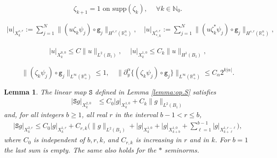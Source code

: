 \documentclass[10pt,a4paper]{amsart}
\newtheorem{lemma}{Lemma}
\newcommand{\N}{{\mathbb N}}
\newcommand{\R}{{\mathbb R}}
\renewcommand{\a}{\alpha}
\newcommand{\pa}{\partial}
\begin{document}
\begin{equation} \label{zeta.k.is.1.where}
\zeta_{k+1} = 1 \text{ on } \mathrm{supp}(\zeta_k), 
\quad \ \forall k \in \N_0.
\end{equation}

\begin{align} \label{def.seminorm}
|u|_{X^{s,r}_k} := \sum_{j=1}^N \| (u \zeta_k \psi_j) \circ \mathtt g_j \|_{H^{s,r}(\R^n_+)},
\quad 
|u|_{X^{s,r}_{*,k}} := \sum_{j=1}^N \| (u \zeta^*_k \psi_j) \circ \mathtt g_j \|_{H^{s,r}(\R^n_+)},
\end{align}

\begin{align} \label{est.u.X.low}
|u|_{X^{0,0}_k} \leq C \| u \|_{L^2(B_1)}, \quad \ 
|u|_{X^{1,0}_k} \leq C_k \| u \|_{H^1(B_1)}, 
\end{align}

\begin{equation}  \label{est.zeta.k.psi.j}
\| (\zeta_k \psi_j) \circ \mathtt g_j \|_{L^\infty(\R^n_+)} \leq 1, \quad 
\| \pa_y^\a \{ (\zeta_k \psi_j) \circ \mathtt g_j \} \|_{L^\infty(\R^n_+)} \leq C_\a 2^{k|\a|}. 
\end{equation}

\begin{lemma} \label{lemma:pinoli.S}
The linear map $\mathtt S$ defined in Lemma \ref{lemma:op.S} satisfies 
\begin{align}
|\mathtt S g|_{X^{2,0}_k} 
& \leq C_0 |g|_{X^{1,0}_k} + C_k \| g \|_{L^2(B_1)} 
\label{pinoli.15}
\end{align}
and, for all integers $b \geq 1$, all real $r$ in the interval $b-1 < r \leq b$, 
\begin{align} 
|\mathtt S g|_{X^{2,r}_k} \leq 
C_0 |g|_{X^{1,r}_k}
+ C_{r,k} \Big( \| g \|_{L^2(B_1)}
+ |g|_{X^{1,0}_k}
+ |g|_{X^{1,0}_{k+b}}
+ \sum_{\ell=1}^{b-1} |g|_{X^{1,r-\ell}_{k+\ell}} \Big),
\label{pinoli.16}
\end{align}
where $C_0$ is independent of $b,r,k$,  
and $C_{r,k}$ is increasing in $r$ and in $k$. 
For $b=1$ the last sum is empty.
The same also holds for the $*$ seminorms. 
\end{lemma}
\end{document}

